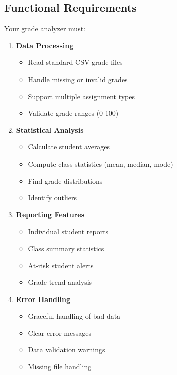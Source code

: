 \documentclass[
  letterpaper,
  DIV=11,
  numbers=noendperiod,
  oneside]{scrreprt}
\providecommand{\tightlist}{%
  \setlength{\itemsep}{0pt}\setlength{\parskip}{0pt}}\usepackage{longtable,booktabs,array}
\begin{document}
\subsection{Functional Requirements}\label{functional-requirements-8}

Your grade analyzer must:

\begin{enumerate}
\def\labelenumi{\arabic{enumi}.}
\tightlist
\item
  \textbf{Data Processing}

  \begin{itemize}
  \tightlist
  \item
    Read standard CSV grade files
  \item
    Handle missing or invalid grades
  \item
    Support multiple assignment types
  \item
    Validate grade ranges (0-100)
  \end{itemize}
\item
  \textbf{Statistical Analysis}

  \begin{itemize}
  \tightlist
  \item
    Calculate student averages
  \item
    Compute class statistics (mean, median, mode)
  \item
    Find grade distributions
  \item
    Identify outliers
  \end{itemize}
\item
  \textbf{Reporting Features}

  \begin{itemize}
  \tightlist
  \item
    Individual student reports
  \item
    Class summary statistics
  \item
    At-risk student alerts
  \item
    Grade trend analysis
  \end{itemize}
\item
  \textbf{Error Handling}

  \begin{itemize}
  \tightlist
  \item
    Graceful handling of bad data
  \item
    Clear error messages
  \item
    Data validation warnings
  \item
    Missing file handling
  \end{itemize}
\end{enumerate}
\end{document}
